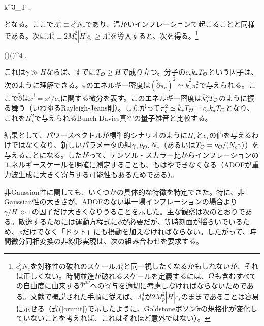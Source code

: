\beq
\label{pzetaw}
k^3\langle\zeta\zeta\rangle_T \simeq  {}  \simeq {},
\eeq

となる。ここで$\Lambda_c^4\equiv c_s^3N_c$であり、温かいインフレーションで起こることと同様である\cite{berera1,berera2,warm}。次に$\Lambda_b^4\equiv2M_p^2|\dot H|c_s\geq\Lambda_c^4$を導入すると、次を得る。\footnote{$c_s^3N_c$を対称性の破れのスケール$\Lambda_b^4$\cite{dan2}と同一視したくなるかもしれないが、それは正しくない。時間並進が破れるスケールを定義するには、${\cal O}$も含むすべての自由度に由来する$\bar T^{\mu\nu}$への寄与を適切に考慮しなければならないためである。文献\cite{dan2}で概説された手順に従えば、$\Lambda_b^4$が$2M_p^2|\dot H|c_s$のままであることは容易に示せる（式(\ref{orunit})で示したように、Goldstoneボソン$\tilde\pi$の規格化が変化していないことを考えれば、これはそれほど意外ではない）。}

\beq
{} \simeq \left(\right)\left(\right)^4 ,
\eeq

これは$\gamma\gg H$ならば、すでに$T_{\cal O}\geq H$で成り立つ。分子の$c_sk_\star T_{\cal O}$という因子は、次のように理解できる。$\pi$のエネルギー密度は$(\tilde\partial\pi_c)^2\simeq\tilde k_\star^2\pi_c^2$で与えられる。ここで$\tilde\partial$は$\tilde x^i=x^i/c_s$に関する微分を表す。このエネルギー密度は$\tilde k_\star^3T_{\cal O}$のように振る舞う（いわゆるRayleigh-Jeans則）。したがって$\pi_c^2\simeq\tilde k_\star T_{\cal O}=c_sk_\star T_{\cal O}$となり、これを$H_\star^2$で与えられるBunch-Davies真空の量子雑音と比較する。

結果として、パワースペクトルが標準的シナリオのように$H_\star$と$\epsilon_\star$の値を与えるわけではなくなり、新しいパラメータの組$\gamma,\nu_{{\cal O}},N_c$（あるいは$T_{\cal O}=\nu_{{\cal O}}/(N_c\gamma)$）を与えることになる。したがって、テンソル・スカラー比からインフレーションのエネルギースケールを明確に測定することも、もはやできなくなる（ADOFが重力波生成に大きく寄与する可能性もあるためである\cite{gwssz}）。

非Gaussian性に関しても、いくつかの具体的な特徴を特定できた。特に、非Gaussian性の大きさが、ADOFのない単一場インフレーションの場合より$\gamma/H\gg1$の因子だけ大きくなりうることを示した。主な観察は次のとおりである。散逸するためには運動方程式に$\dot\phi$が必要だが、等時刻面が揺らいでいるため、$\phi$だけでなく「ドット」にも摂動を加えなければならない。したがって、時間微分同相変換の非線形実現は、次の組み合わせを要求する。

